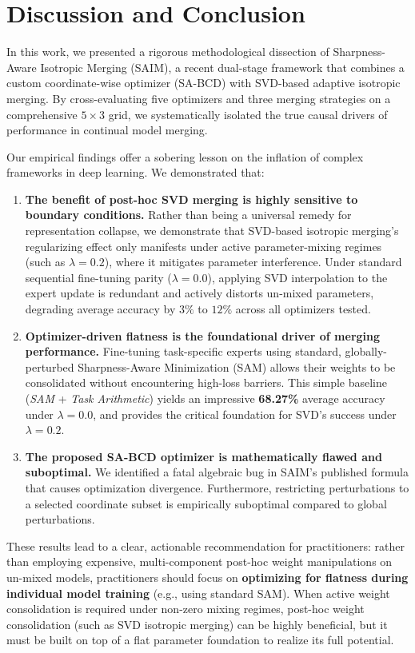\section{Discussion and Conclusion}
\label{sec:conclusion}

In this work, we presented a rigorous methodological dissection of Sharpness-Aware Isotropic Merging (SAIM), a recent dual-stage framework that combines a custom coordinate-wise optimizer (SA-BCD) with SVD-based adaptive isotropic merging. By cross-evaluating five optimizers and three merging strategies on a comprehensive $5 \times 3$ grid, we systematically isolated the true causal drivers of performance in continual model merging.

Our empirical findings offer a sobering lesson on the inflation of complex frameworks in deep learning. We demonstrated that:
\begin{enumerate}
  \item \textbf{The benefit of post-hoc SVD merging is highly sensitive to boundary conditions.} Rather than being a universal remedy for representation collapse, we demonstrate that SVD-based isotropic merging's regularizing effect only manifests under active parameter-mixing regimes (such as $\lambda = 0.2$), where it mitigates parameter interference. Under standard sequential fine-tuning parity ($\lambda = 0.0$), applying SVD interpolation to the expert update is redundant and actively distorts un-mixed parameters, degrading average accuracy by $3\%$ to $12\%$ across all optimizers tested.
  \item \textbf{Optimizer-driven flatness is the foundational driver of merging performance.} Fine-tuning task-specific experts using standard, globally-perturbed Sharpness-Aware Minimization (SAM) allows their weights to be consolidated without encountering high-loss barriers. This simple baseline (\emph{SAM} + \emph{Task Arithmetic}) yields an impressive \textbf{68.27\%} average accuracy under $\lambda=0.0$, and provides the critical foundation for SVD's success under $\lambda=0.2$.
  \item \textbf{The proposed SA-BCD optimizer is mathematically flawed and suboptimal.} We identified a fatal algebraic bug in SAIM's published formula that causes optimization divergence. Furthermore, restricting perturbations to a selected coordinate subset is empirically suboptimal compared to global perturbations.
\end{enumerate}

These results lead to a clear, actionable recommendation for practitioners: rather than employing expensive, multi-component post-hoc weight manipulations on un-mixed models, practitioners should focus on \textbf{optimizing for flatness during individual model training} (e.g., using standard SAM). When active weight consolidation is required under non-zero mixing regimes, post-hoc weight consolidation (such as SVD isotropic merging) can be highly beneficial, but it must be built on top of a flat parameter foundation to realize its full potential.

